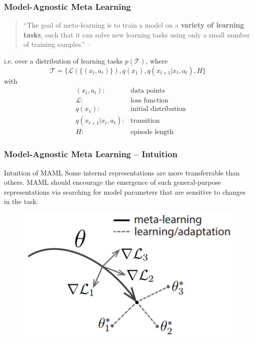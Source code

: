\begin{frame}
\frametitle{Model-Agnostic Meta Learning}

\begin{quote}
    ``The goal of meta-learning is to train a model on a {\bfseries variety of {\color{red} learning tasks}}, such that it can solve new learning tasks using only a small number of training samples.'' \hfill -- \cite{finn2017maml}
\end{quote}

\vspace{0.6em}

i.e. over a distribution of learning tasks $p(\mathcal{T})$, where
$$\mathcal{T} = \{ \mathcal{L}(\{(x_t,a_t)\}), q(x_1), q(x_{t+1}|x_t, a_t), H \}$$
with
\begin{align*}
    & (x_t,a_t): & \text{data points} \\
    & \mathcal{L}: & \text{loss function} \\
    & q(x_1): & \text{initial distribution} \\
    & q(x_{t+1}|x_t, a_t): & \text{transition} \\
    & H: & \text{episode length}
\end{align*}

\end{frame}


\begin{frame}
\frametitle{Model-Agnostic Meta Learning -- Intuition}

\begin{block}{Intuition of MAML}
Some internal representations are more transferrable than others. MAML should encourage the emergence of such general-purpose representations via searching for model parameters that are sensitive to changes in the task.
\end{block}

\begin{figure}
    \centering
    \includegraphics[keepaspectratio,width=.65\textwidth]{images/maml.png}
\end{figure}

\end{frame}

